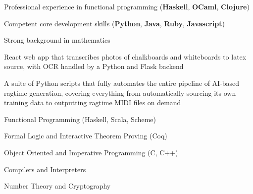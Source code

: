 
\begin{tightitemize}
    \item Professional experience in functional programming (\textbf{Haskell}, 
        \textbf{OCaml},
        \textbf{Clojure})
    \item Competent core development skills (\textbf{Python}, \textbf{Java}, 
    \textbf{Ruby}, \textbf{Javascript})
    \item Strong background in mathematics
\end{tightitemize}

\smallskip
{}

React web app that transcribes photos of chalkboards and whiteboards to latex 
source, with OCR handled by a Python and Flask backend

\divider

A suite of Python scripts that fully automates the entire pipeline of
AI-based ragtime generation, covering everything from automatically sourcing 
its own training data to outputting ragtime MIDI files on demand

\smallskip
{}

\smallskip
{}

\divider


\divider


\vspace{-0.5em}

\begin{tightitemize}
    \item Functional Programming (Haskell, Scala, Scheme) 
    \item Formal Logic and Interactive Theorem Proving (Coq)
    \item Object Oriented and Imperative Programming (C, C++)
    \item Compilers and Interpreters
    \item Number Theory and Cryptography
\end{tightitemize}
\smallskip



